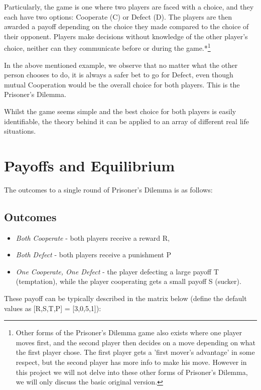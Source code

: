\documentclass{icldt}
\numberwithin{equation}{section}       %
\begin{document}
Particularly, the game is one where two players are faced with a choice, and they each have two options: Cooperate (C) or Defect (D). The players are then awarded a payoff depending on the choice they made compared to the choice of their opponent. Players make decisions without knowledge of the other player's choice, neither can they communicate before or during the game.*\footnote{ Other forms of the Prisoner's Dilemma game also exists where one player moves first, and the second player then decides on a move depending on what the first player chose. The first player gets a 'first mover's advantage' in some respect, but the second player has more info to make his move. However in this project we will not delve into these other forms of Prisoner's Dilemma, we will only discuss the basic original version.}

In the above mentioned example, we observe that no matter what the other person chooses to do, it is always a safer bet to go for Defect, even though mutual Cooperation would be the overall choice for both players. This is the Prisoner's Dilemma.

Whilst the game seems simple and the best choice for both players is easily identifiable, the theory behind it can be applied to an array of different real life situations.

\section{Payoffs and Equilibrium}
\label{sect:Payoffs and Equilibrium}
The outcomes to a single round of Prisoner's Dilemma is as follows: 
\subsection{Outcomes}
\begin{itemize}
	\item \emph{Both Cooperate} - both players receive a reward R, 
	\item \emph{Both Defect} - both players receive a punishment P
	\item \emph{One Cooperate, One Defect} - the player defecting a large payoff T (temptation), while the player cooperating gets a small payoff S (sucker).
\end{itemize}
These payoff can be typically described in the matrix below (define the default values as [R,S,T,P] = [3,0,5,1]):
\end{document}
